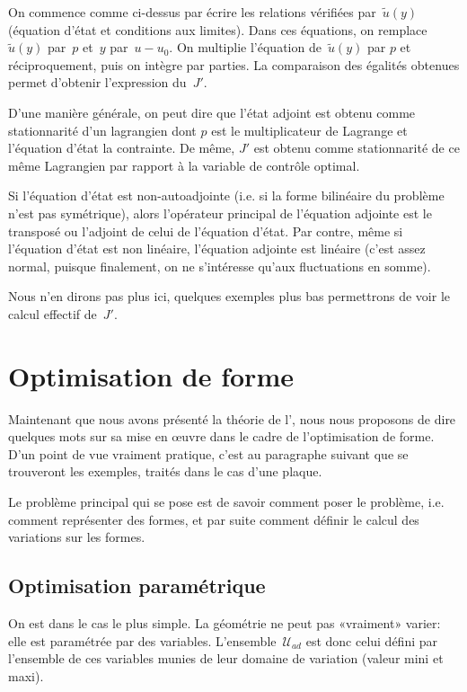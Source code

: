 On commence comme ci-dessus par écrire les relations vérifiées par~$\tilde{u}(y)$ (équation d'état et conditions aux limites). Dans ces équations, on remplace~$\tilde{u}(y)$ par~$p$ et~$y$ par~$u-u_0$. On multiplie l'équation de~$\tilde{u}(y)$ par $p$ et réciproquement, puis on intègre par parties. La comparaison des égalités obtenues permet d'obtenir l'expression du~$J'$.

D'une manière générale, on peut dire que l'état adjoint est obtenu comme stationnarité d'un lagrangien dont $p$ est le multiplicateur de Lagrange et l'équation d'état la contrainte.
De même, $J'$ est obtenu comme stationnarité de ce même Lagrangien par rapport à la variable de contrôle optimal.

Si l'équation d'état est non-autoadjointe (i.e. si la forme bilinéaire du problème n'est pas symétrique), alors l'opérateur principal de l'équation adjointe est le transposé ou l'adjoint de celui de l'équation d'état.
Par contre, même si l'équation d'état est non linéaire, l'équation adjointe est linéaire (c'est assez normal, puisque finalement, on ne s'intéresse qu'aux fluctuations en somme).

Nous n'en dirons pas plus ici, quelques exemples plus bas permettrons de voir le calcul effectif de~$J'$.


\medskip
\section{Optimisation de forme}

Maintenant que nous avons présenté la théorie de l', nous nous proposons de dire quelques mots sur sa mise en œuvre dans le cadre de l'optimisation de forme. D'un point de vue vraiment pratique, c'est au paragraphe suivant que se trouveront les exemples, traités dans le cas d'une plaque.

\medskip
Le problème principal qui se pose est de savoir comment poser le problème, i.e. comment représenter des formes, et par suite comment définir le calcul des variations sur les formes.

\medskip
\subsection{Optimisation paramétrique}

On est dans le cas le plus simple. La géométrie ne peut pas «vraiment» varier: elle est paramétrée par des variables. L'ensemble~$\mathcal{U}_{ad}$ est donc celui défini par l'ensemble de ces variables munies de leur domaine de variation (valeur mini et maxi).

